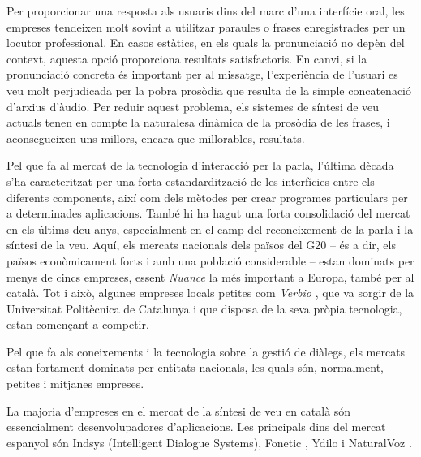 \begin{multicols}{2}

Per proporcionar una resposta als usuaris dins del marc d’una interfície oral, les empreses tendeixen molt sovint a utilitzar paraules o frases enregistrades per un locutor professional. En casos estàtics, en els quals la pronunciació no depèn del context, aquesta opció proporciona resultats satisfactoris. En canvi, si la pronunciació concreta és important per al missatge, l’experiència de l’usuari es veu molt perjudicada per la pobra prosòdia que resulta de la simple concatenació d’arxius d’àudio. Per reduir aquest problema, els sistemes de síntesi de veu actuals tenen en compte la naturalesa dinàmica de la prosòdia de les frases, i aconsegueixen uns millors, encara que millorables, resultats. 

Pel que fa al mercat de la tecnologia d’interacció per la parla, l’última dècada s’ha caracteritzat per una forta estandardització de les interfícies entre els diferents components, així com dels mètodes per crear programes particulars per a determinades aplicacions. També hi ha hagut una forta consolidació del mercat en els últims deu anys, especialment en el camp del reconeixement de la parla i la síntesi de la veu. Aquí, els mercats nacionals dels països del G20 -- és a dir, els països econòmicament forts i amb una població considerable -- estan dominats per menys de cincs empreses, essent \textit{Nuance} la més important a Europa, també per al català. Tot i això, algunes empreses locals petites com \textit{Verbio} \cite{CAT-Nota25}, que va sorgir de la Universitat Politècnica de Catalunya i que disposa de la seva pròpia tecnologia, estan començant a competir.

Pel que fa als coneixements i la tecnologia sobre la gestió de diàlegs, els mercats estan fortament dominats per entitats nacionals, les quals són, normalment, petites i mitjanes empreses. 

La majoria d’empreses en el mercat de la síntesi de veu en català són essencialment desenvolupadores d’aplicacions. Les principals dins del mercat espanyol són Indsys \cite{CAT-Nota26} (Intelligent Dialogue Systems), Fonetic \cite{CAT-Nota27}, Ydilo \cite{CAT-Nota28} i NaturalVoz \cite{CAT-Nota29}.


\end{multicols}
